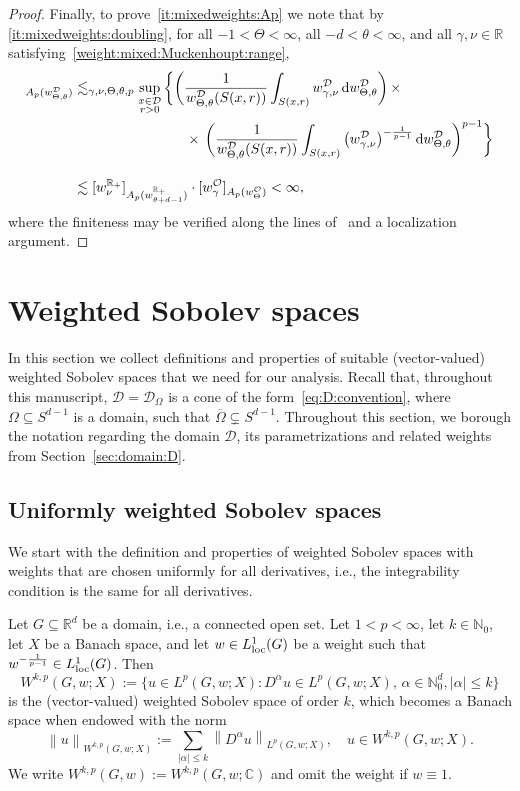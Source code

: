 \documentclass[12pt,a4paper, reqno]{amsart}
\theoremstyle{plain}
\theoremstyle{definition}
\theoremstyle{remark}
\numberwithin{equation}{section}
\newcommand{\1}{\mathbbm{1}}
\newcommand{\dd}{\textup{d}}
\newcommand{\R}{\ensuremath{\mathbb{R}}}
\newcommand{\N}{\ensuremath{\mathbb{N}}}
\newcommand{\C}{\ensuremath{\mathbb{C}}}
\newcommand{\calO}{\ensuremath{\mathcal{O}}}
\newcommand{\calD}{\ensuremath{\mathcal{D}}}
\newcommand{\nrm}[1]{\left\lVert #1 \right\rVert}
\begin{document}
\begin{proof}
Finally, to prove~\ref{it:mixedweights:Ap} we note that by \ref{it:mixedweights:doubling}, for all $-1<\Theta<\infty$, all $-d<\theta<\infty$, and all $\gamma,\nu\in\R$ satisfying~\eqref{weight:mixed:Muckenhoupt:range}, 
\begin{align*}
[w_{\gamma,\nu}^\calD]_{A_p(w_{\Theta,\theta}^\calD)}
&\lesssim_{\gamma,\nu,\Theta,\theta,p} 
\sup_{\substack{x\in\calD\\ r>0}}
\bigg\{
\bigg(\frac{1}{w_{\Theta,\theta}^\calD(S(x,r))} \int_{S(x,r)} w_{\gamma,\nu}^\calD\,\dd w_{\Theta,\theta}^\calD\bigg)\,\times\\
&\qquad\qquad\qquad\qquad \times\,
\bigg(\frac{1}{w_{\Theta,\theta}^\calD(S(x,r))} \int_{S(x,r)} \big(w_{\gamma,\nu}^\calD\big)^{-\frac{1}{p-1}}\,\dd w_{\Theta,\theta}^\calD\bigg)^{p-1}\bigg\}\\[1em]
&\lesssim
[w_\nu^{\R_+}]_{A_p(w_{\theta+d-1}^{\R_+})}
\cdot
[w_\gamma^{\calO}]_{A_p(w_\Theta^{\calO})}
<\infty,
\end{align*}
where the finiteness may be verified along the lines of~\cite[Example~7.1.7]{Grafakos2014classical} and a localization argument.
\end{proof}





\section{Weighted Sobolev spaces}\label{sec:WSob}

In this section we collect definitions and properties of suitable (vector-valued) weighted  Sobolev spaces that we need for our analysis. Recall that, throughout this manuscript, $\calD=\calD_\Omega$ is a cone of the form~\eqref{eq:D:convention}, where $\Omega\subseteq S^{d-1}$ is a domain, such that $\overline{\Omega}\subsetneq S^{d-1}$. Throughout this section, we borough the notation regarding the domain $\calD$, its parametrizations and related weights from Section~\ref{sec:domain:D}.

\subsection{Uniformly weighted Sobolev spaces}\label{sec:Sobolev:uniform}
We start with the definition and properties of weighted Sobolev spaces with weights that are chosen uniformly for all derivatives, i.e., the integrability condition is the same for all derivatives.

Let $G\subseteq\R^d$ be a domain, i.e.,  a connected open set.
Let $1<p<\infty$, let $k\in\N_0$, let $X$ be a Banach space, and let $w\in L^1_\textup{loc}(G)$ be a weight such that $w^{-\frac{1}{p-1}}\in L^1_\textup{loc}(G)$. Then
\[
W^{k,p}(G,w;X):=\big\{ u\in L^p(G,w;X)\colon D^\alpha u\in L^p(G,w;X),\,\alpha\in\N_0^d,\lvert\alpha\rvert\leq k\big\}
\]
is the (vector-valued) weighted Sobolev space 
of order $k$, which becomes a Banach space when endowed with the norm
\[
\nrm{u}_{W^{k,p}(G,w;X)}:=\sum_{\lvert\alpha\rvert\leq k}\nrm{D^\alpha u}_{L^p(G,w;X)},\quad u\in W^{k,p}(G,w;X).
\]
We write $W^{k,p}(G,w):=W^{k,p}(G,w;\C)$ and omit the weight if $w\equiv 1$. 
\end{document}
